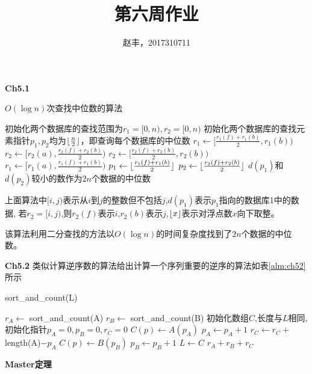 \documentclass{article}
\DeclarePairedDelimiter{\floor}{\lfloor}{\rfloor}
\begin{document}
\title{第六周作业}
\author{赵丰，2017310711}
\maketitle

\textbf{Ch5.1}
\begin{algorithm}
\caption{$O(\log n)$次查找中位数的算法}
\begin{algorithmic}[1]
\STATE 初始化两个数据库的查找范围为$r_1=[0,n),r_2=[0,n)$
\STATE 初始化两个数据库的查找元素指针$p_1,p_2$均为$\floor{\frac{n}{2}}$，即查询每个数据库的中位数
\STATE $r_1 \leftarrow [\frac{r_1(f)+r_1(b)}{2},r_1(b))$
\STATE $r_2 \leftarrow [r_2(a),\frac{r_2(f)+r_2(b)}{2})$
\ELSE 
\STATE $r_2 \leftarrow [\frac{r_2(f)+r_2(b)}{2},r_2(b))$
\STATE $r_1 \leftarrow [r_1(a),\frac{r_1(f)+r_1(b)}{2})$
\ENDIF
\STATE $p_1 \leftarrow \floor{\frac{r_1(f)+r_1(b)}{2}}$
\STATE $p_2 \leftarrow \floor{\frac{r_2(f)+r_2(b)}{2}}$
\ENDWHILE
\RETURN $d(p_1)$和$d(p_2)$较小的数作为$2n$个数据的中位数
\end{algorithmic}
\end{algorithm}

上面算法中$[i,j)$表示从$i到j$的整数但不包括$j$,$d(p_1)$表示$p_1$指向的数据库1中的数据,
若$r_2=[i,j)$,则$r_2(f)$表示$i$,$r_2(b)$表示$j$,$\floor{x}$表示对浮点数$x$向下取整。

该算法利用二分查找的方法以$O(\log n)$的时间复杂度找到了$2n$个数据的中位数。

\textbf{Ch5.2}
类似计算逆序数的算法给出计算一个序列重要的逆序的算法如表\ref{alm:ch52}所示

\begin{algorithm}
\caption{sort\_and\_count(L)}\label{alm:ch52}
\begin{algorithmic}[1]
\ENDIF
\STATE $r_A \leftarrow $ sort\_and\_count(A)
\STATE $r_B \leftarrow $ sort\_and\_count(B)
\STATE 初始化数组$C$,长度与$L$相同,初始化指针$p_A=0,p_B=0,r_C=0$
\STATE $C(p)\leftarrow A(p_A)$
\STATE $p_A \leftarrow p_A+1$
\ELSE
\STATE $r_C \leftarrow r_C+$length(A)$-p_A$
\STATE $C(p)\leftarrow B(p_B)$
\STATE $p_B \leftarrow p_B+1$
\ENDIF
\ENDFOR
\STATE $L \leftarrow C$ 
\RETURN $r_A+r_B+r_C$
\end{algorithmic}
\end{algorithm}


\textbf{Master定理}
\end{document}
